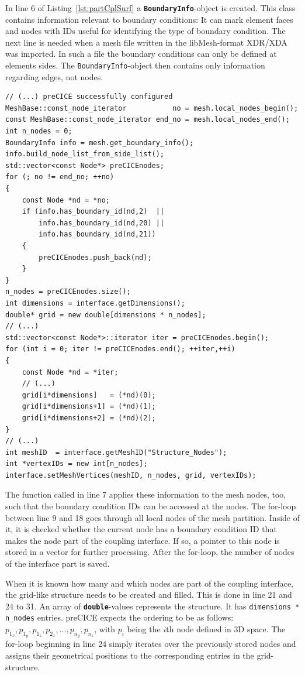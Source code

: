    In line 6 of Listing~\ref{lst:partCplSurf} a \texttt{\textbf{BoundaryInfo}}-object is created. This class contains information relevant to boundary conditions: It can mark element faces and nodes with IDs useful for identifying the type of boundary condition. The next line is needed when a mesh file written in the libMesh-format XDR/XDA was imported. In such a file the boundary conditions can only be defined at elements sides. The \texttt{BoundaryInfo}-object then contains only information regarding edges, not nodes.   
\begin{lstlisting}[caption=Partition Coupling Surface,label=lst:partCplSurf,keepspaces=true]
// (...) preCICE successfully configured
MeshBase::const_node_iterator           no = mesh.local_nodes_begin();
const MeshBase::const_node_iterator end_no = mesh.local_nodes_end();
int n_nodes = 0;
BoundaryInfo info = mesh.get_boundary_info();
info.build_node_list_from_side_list();
std::vector<const Node*> preCICEnodes;
for (; no != end_no; ++no)
{
	const Node *nd = *no;
   	if (info.has_boundary_id(nd,2)  ||
	    info.has_boundary_id(nd,20) ||
	    info.has_boundary_id(nd,21))
   	{
	   	preCICEnodes.push_back(nd);
   	}
}
n_nodes = preCICEnodes.size();
int dimensions = interface.getDimensions();
double* grid = new double[dimensions * n_nodes];
// (...)
std::vector<const Node*>::iterator iter = preCICEnodes.begin();
for (int i = 0; iter != preCICEnodes.end(); ++iter,++i)
{
	const Node *nd = *iter;
	// (...)
	grid[i*dimensions]   = (*nd)(0);
	grid[i*dimensions+1] = (*nd)(1);
	grid[i*dimensions+2] = (*nd)(2);
}
// (...)
int meshID  = interface.getMeshID("Structure_Nodes");
int *vertexIDs = new int[n_nodes];
interface.setMeshVertices(meshID, n_nodes, grid, vertexIDs);
\end{lstlisting}
   The function called in line 7 applies these information to the mesh nodes, too, such that the boundary condition IDs can be accessed at the nodes. The for-loop between line 9 and 18 goes through all local nodes of the mesh partition. Inside of it, it is checked whether the current node has a boundary condition ID that makes the node part of the coupling interface. If so, a pointer to this node is stored in a vector for further processing. After the for-loop, the number of nodes of the interface part is saved.
   
   When it is known how many and which nodes are part of the coupling interface, the grid-like structure needs to be created and filled. This is done in line 21 and 24 to 31. An array of \texttt{\textbf{double}}-values represents the structure. It has \texttt{dimensions * n\_nodes} entries. preCICE expects the ordering to be as follows: $p_{1_x}, p_{1_y}, p_{1_z}, p_{2_x}, \ldots, p_{n_y}, p_{n_z}$, with $p_i$ being the $i$th node defined in 3D space. The for-loop beginning in line 24 simply iterates over the previously stored nodes and assigns their geometrical positions to the corresponding entries in the grid-structure.
   
